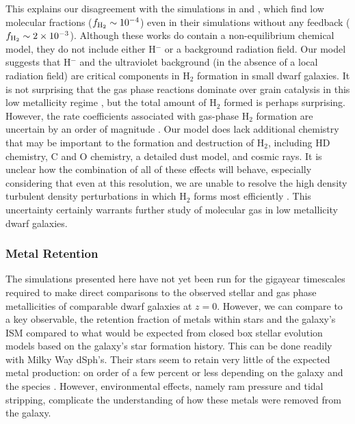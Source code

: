 \documentclass[twocolumn]{aastex61}
\begin{document}
This explains our 
    disagreement
with the simulations in \citet{Hu2016} and \citet{Hu2017}, which find low molecular fractions ($f_{\rm H_2} \sim 10^{-4}$) even in their simulations without any feedback ($f_{\rm H_2} \sim 2 \times 10^{-3}$). Although these works do contain a non-equilibrium chemical model, they do not include either H$^{-}$ or a background radiation field. Our model suggests that H$^{-}$ and the ultraviolet background (in the absence of a local radiation field) are critical components in H$_2$ formation in small dwarf galaxies. It is not surprising that the gas phase reactions dominate over grain catalysis in this low metallicity regime \citep{Glover2003}, but the total amount of H$_2$ formed is perhaps surprising. However, the rate coefficients associated with gas-phase H$_2$ formation are uncertain by an order of magnitude \citep{Glover2006,Glover2007}.
    Our model does lack additional chemistry that
may be important to the formation and destruction of H$_2$, including HD chemistry, C and O chemistry, a detailed dust model, and cosmic rays. It is unclear how the combination of all of these effects will behave, especially considering that even at this resolution, we are unable to resolve the high density turbulent density perturbations in which H$_2$ forms most efficiently \citep{Glover2007}. This uncertainty certainly warrants further study of molecular gas in low metallicity dwarf galaxies.

\subsubsection{Metal Retention}
\label{sec:obs_metals}

The simulations presented here have not yet been run for the gigayear timescales required to make direct comparisons to the observed stellar and gas phase metallicities of comparable dwarf galaxies at $z = 0$. However, we can compare to a key observable, the retention fraction of metals within stars and the galaxy's ISM compared to what would be expected from
  closed box
stellar evolution models based on the galaxy's star formation history. This can be done readily with Milky Way dSph's. Their stars seem to retain very little of the expected metal production: on order of a few percent or less depending on the galaxy and the species \citep{Kirby2011-metals}. However, environmental effects, namely ram pressure and tidal stripping, complicate the understanding of how these metals were removed from the galaxy. 
\end{document}
